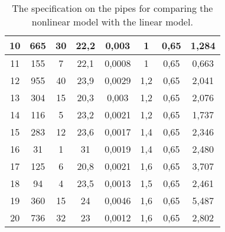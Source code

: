\begin{table}[H]
\begin{tabular}{|c|c|c|c|c|c|c|c|}
10                                                         & 665            & 30       & 22,2       & 0,003  & 1         & 0,65     & 1,284                                                                          \\ \hline
11                                                         & 155            & 7        & 22,1       & 0,0008 & 1         & 0,65     & 0,663                                                                          \\ \hline
12                                                         & 955            & 40       & 23,9       & 0,0029 & 1,2       & 0,65     & 2,041                                                                          \\ \hline
13                                                         & 304            & 15       & 20,3       & 0,003  & 1,2       & 0,65     & 2,076                                                                          \\ \hline
14                                                         & 116            & 5        & 23,2       & 0,0021 & 1,2       & 0,65     & 1,737                                                                          \\ \hline
15                                                         & 283            & 12       & 23,6       & 0,0017 & 1,4       & 0,65     & 2,346                                                                          \\ \hline
16                                                         & 31             & 1        & 31         & 0,0019 & 1,4       & 0,65     & 2,480                                                                          \\ \hline
17                                                         & 125            & 6        & 20,8       & 0,0021 & 1,6       & 0,65     & 3,707                                                                          \\ \hline
18                                                         & 94             & 4        & 23,5       & 0,0013 & 1,5       & 0,65     & 2,461                                                                          \\ \hline
19                                                         & 360            & 15       & 24         & 0,0046 & 1,6       & 0,65     & 5,487                                                                          \\ \hline
20                                                         & 736            & 32       & 23         & 0,0012 & 1,6       & 0,65     & 2,802                                                                          \\ \hline
\end{tabular}
\caption{The specification on the pipes for comparing the nonlinear model with the linear model.}
\label{tab:pipe_data_nonlinear_linear_test}
\end{table}


